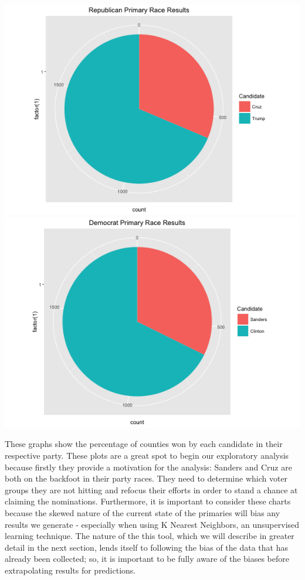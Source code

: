\documentclass[11pt]{article}
\begin{document}
\includegraphics[scale=0.4]{../exploratory_plots/Republican_Primary.png}
\includegraphics[scale=0.4]{../exploratory_plots/Democrat_Primary.png}

These graphs show the percentage of counties won by each candidate in their respective party. These plots are a great spot to begin our exploratory analysis because firstly they provide a motivation for the analysis: Sanders and Cruz are both on the backfoot in their party races. They need to determine which voter groups they are not hitting and refocus their efforts in order to stand a chance at claiming the nominations. Furthermore, it is important to consider these charts because the skewed nature of the current state of the primaries will bias any results we generate - especially when using K Nearest Neighbors, an unsupervised learning technique. The nature of the this tool, which we will describe in greater detail in the next section, lends itself to following the bias of the data that has already been collected; so, it is important to be fully aware of the biases before extrapolating results for predictions. \\
\end{document}
